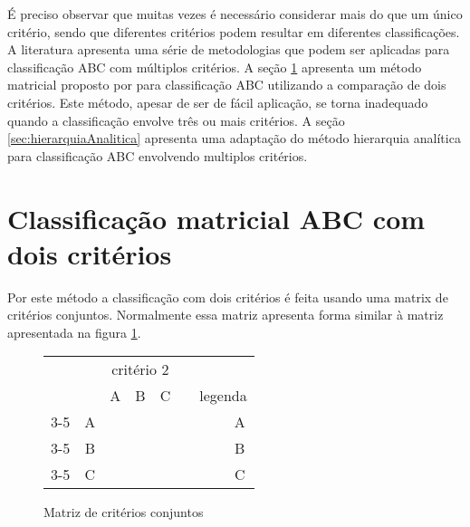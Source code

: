 \documentclass{book}
\begin{document}
É preciso observar que muitas vezes é necessário considerar mais do que um único critério, sendo que diferentes critérios podem resultar em diferentes classificações. A literatura apresenta uma série de metodologias que podem ser aplicadas para classificação ABC com múltiplos critérios. A seção \ref{biCriteriaABC} apresenta um método matricial proposto por \cite{FloresWhybark1985} para classificação ABC utilizando a comparação de dois critérios. Este método, apesar de ser de fácil aplicação, se torna inadequado quando a classificação envolve três ou mais critérios. A seção \ref{sec:hierarquiaAnalitica} apresenta uma adaptação do método hierarquia analítica \citep{Saaty1987} para classificação ABC envolvendo multiplos critérios.

\section{Classificação matricial ABC com dois critérios}
\label{biCriteriaABC}

Por este método a classificação com dois critérios é feita usando uma matrix de critérios conjuntos. Normalmente essa matriz apresenta forma similar à matriz apresentada na figura \ref{fig:jointMatrix}.

\begin{figure}[h]
\begin{center}
\begin{tabular}[c]{c c | c | c | c | c c c c}
&\multicolumn{1}{c}{}  & \multicolumn{3}{c}{critério 2} \\ 
& \multicolumn{1}{c}{} &\multicolumn{1}{c}{A} &\multicolumn{1}{c}{B} & \multicolumn{1}{c}{C} & & \multicolumn{3}{c}{legenda} \\
\cline {3-5}
\multirow{3}{*}{\begin{turn}{90} critério 1 \end{turn}} & A & \cellcolor{green} & \cellcolor{green} & \multicolumn{1}{|b|}{} & &  & \cellcolor{green} & A \\ 
\cline {3-5}
& B & \cellcolor{green} &  \multicolumn{1}{|b|}{} & \cellcolor{yellow}  & & & \cellcolor{blue} & B \\
\cline {3-5}
& C & \multicolumn{1}{|b|}{} &  \cellcolor{yellow} & \cellcolor{yellow} & & & \cellcolor{yellow} & C\\ 
\end{tabular}
\end{center}
\caption{Matriz de critérios conjuntos}
\label{fig:jointMatrix}
\end{figure}
\end{document}

